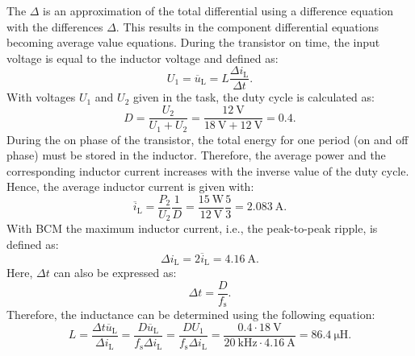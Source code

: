 \begin{solutionblock}
The $\Delta$ is an approximation of the total differential using a difference equation with the differences $\Delta$. This results in the component differential equations becoming average value equations.
During the transistor on time, the input voltage is equal to the inductor voltage and defined as:
\begin{equation}
    U_{\mathrm{1}} = \overline u_{\mathrm{L}} = L \frac{\Delta i_{\mathrm{L}} }{\Delta t}. 
\end{equation}
    With voltages $U_1$ and $U_2$ given in the task, the duty cycle is calculated as:
\begin{equation}
    D = \frac{U_\mathrm{2}}{U_\mathrm{1}+U_\mathrm{2}} = \frac{\SI{12}{\volt}}{\SI{18}{\volt}+\SI{12}{\volt}} = 0.4.
\end{equation}
During the on phase of the transistor, the total energy for one period (on and off phase) must be stored in the inductor. Therefore, the average power and the corresponding inductor current increases with the inverse value of the duty cycle. Hence, the average inductor current is given with:
\begin{equation}
    \overline{i}_\mathrm{L} = \frac{P_\mathrm{2}}{U_\mathrm{2}} \frac{1}{D}=\frac{\SI{15}{\watt}}{\SI{12}{\volt}}\frac{5}{3}=\SI{2.083}{\ampere}.
\end{equation}
With BCM the maximum inductor current, i.e., the peak-to-peak ripple, is defined as:
\begin{equation}
    \Delta i_{\mathrm{L}} = 2 \overline{i}_\mathrm{L} = \SI{4.16}{\ampere}.
\end{equation}
Here, $\Delta t$ can also be expressed as:
\begin{equation}
    \Delta t = \frac{D}{f_\mathrm{s}}.
\end{equation}
Therefore, the inductance can be determined using the following equation:
\begin{equation}
    L = \frac{\Delta t  \overline u_{\mathrm{L}}}{\Delta i_{\mathrm{L}}}= \frac{D \overline u_{\mathrm{L}}}{f_\mathrm{s}\Delta i_{\mathrm{L}}}= \frac{D U_{\mathrm{1}}}{f_\mathrm{s}\Delta i_{\mathrm{L}}} = \frac{0.4 \cdot \SI{18}{\volt}}{\SI{20}{\kilo\hertz}\cdot \SI{4.16}{\ampere }} = \SI{86.4}{\micro\henry}.
\end{equation}

\end{solutionblock}

